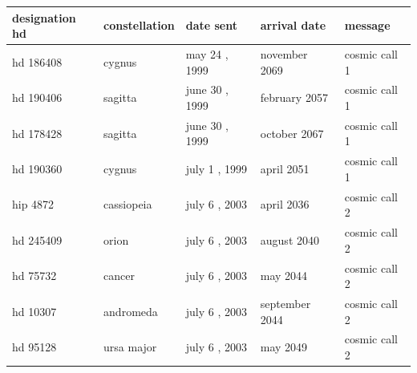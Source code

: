 \documentclass{article}
\begin{document}
\begin{tabular}{lllll}
\toprule
designation hd & constellation & date sent & arrival date & message \\
\midrule
hd 186408 & cygnus & may 24 , 1999 & november 2069 & cosmic call 1 \\
hd 190406 & sagitta & june 30 , 1999 & february 2057 & cosmic call 1 \\
hd 178428 & sagitta & june 30 , 1999 & october 2067 & cosmic call 1 \\
hd 190360 & cygnus & july 1 , 1999 & april 2051 & cosmic call 1 \\
hip 4872 & cassiopeia & july 6 , 2003 & april 2036 & cosmic call 2 \\
hd 245409 & orion & july 6 , 2003 & august 2040 & cosmic call 2 \\
hd 75732 & cancer & july 6 , 2003 & may 2044 & cosmic call 2 \\
hd 10307 & andromeda & july 6 , 2003 & september 2044 & cosmic call 2 \\
hd 95128 & ursa major & july 6 , 2003 & may 2049 & cosmic call 2 \\
\bottomrule
\end{tabular}
\end{document}
